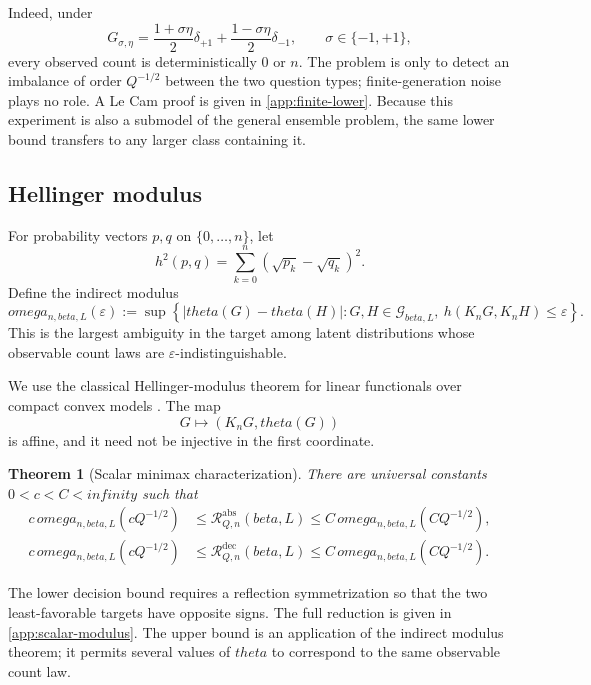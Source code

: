 \documentclass[11pt]{article}
\def\beta{beta}%
\def\theta{theta}%
\def\omega{omega}%
\def\infty{infinity}%
\newtheorem{theorem}{Theorem}[section]
\newcommand{\calG}{\mathcal G}
\newcommand{\calR}{\mathcal R}
\newcommand{\eps}{\varepsilon}
\begin{document}
Indeed, under
\[
G_{\sigma,\eta}
=
\frac{1+\sigma\eta}{2}\delta_{+1}
+
\frac{1-\sigma\eta}{2}\delta_{-1},
\qquad \sigma\in\{-1,+1\},
\]
every observed count is deterministically $0$ or $n$.  The problem is only to detect an imbalance of order $Q^{-1/2}$ between the two question types; finite-generation noise plays no role.  A Le Cam proof is given in \cref{app:finite-lower}.  Because this experiment is also a submodel of the general ensemble problem, the same lower bound transfers to any larger class containing it.

\subsection{Hellinger modulus}

For probability vectors $p,q$ on $\{0,\dots,n\}$, let
\[
h^2(p,q)
=
\sum_{k=0}^n(\sqrt{p_k}-\sqrt{q_k})^2.
\]
Define the indirect modulus
\begin{equation}
\label{eq:modulus}
\omega_{n,\beta,L}(\eps)
:=
\sup\left\{
|\theta(G)-\theta(H)|:
G,H\in\calG_{\beta,L},
\ h(K_nG,K_nH)\le\eps
\right\}.
\end{equation}
This is the largest ambiguity in the target among latent distributions whose observable count laws are $\eps$-indistinguishable.

We use the classical Hellinger-modulus theorem for linear functionals over compact convex models \citep{DonohoLiuII,JuditskyNemirovski}.  The map
\[
G\mapsto(K_nG,\theta(G))
\]
is affine, and it need not be injective in the first coordinate.

\begin{theorem}[Scalar minimax characterization]
\label{thm:scalar-modulus}
There are universal constants $0<c<C<\infty$ such that
\begin{align}
 c\,\omega_{n,\beta,L}(cQ^{-1/2})
&\le
\calR^{\mathrm{abs}}_{Q,n}(\beta,L)
\le
C\,\omega_{n,\beta,L}(CQ^{-1/2}),
\label{eq:abs-modulus}\\
 c\,\omega_{n,\beta,L}(cQ^{-1/2})
&\le
\calR^{\mathrm{dec}}_{Q,n}(\beta,L)
\le
C\,\omega_{n,\beta,L}(CQ^{-1/2}).
\label{eq:dec-modulus}
\end{align}
\end{theorem}

The lower decision bound requires a reflection symmetrization so that the two least-favorable targets have opposite signs.  The full reduction is given in \cref{app:scalar-modulus}.  The upper bound is an application of the indirect modulus theorem; it permits several values of $\theta$ to correspond to the same observable count law.
\end{document}
